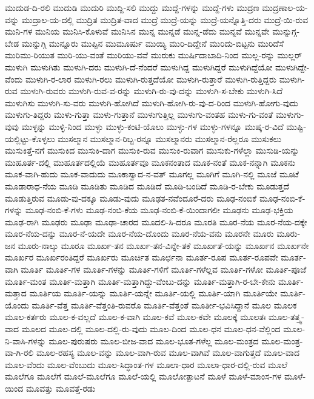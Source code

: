 {ಮುದುಡ-ದಿ-ರಲಿ
ಮುದುಡಿ
ಮುದುರಿ
ಮುದ್ದಿ-ಸಲಿ
ಮುದ್ದು
ಮುದ್ದೆ-ಗಳನ್ನು
ಮುದ್ದೆ-ಗಳು
ಮುದ್ರಣ
ಮುದ್ರಣಾಲ-ಯ-ವನ್ನು
ಮುದ್ರಾಲ-ಯ-ದಲ್ಲಿ
ಮುದ್ರಿತ
ಮುದ್ರಿತ-ವಾದ
ಮುದ್ರೆ
ಮುದ್ರೆ-ಯನ್ನು
ಮುದ್ರೆ-ಯನ್ನೊತ್ತಿ-ದರು
ಮುದ್ರೆ-ಯಿ-ರುವ
ಮುನಿ-ಗಳ
ಮುನಿಯ
ಮುನಿಸಿ-ಕೊಳುವೆ
ಮುನಿಸಿನ
ಮುನ್ನ
ಮುನ್ನಡೆ
ಮುನ್ನ-ಡೆದು
ಮುನ್ನವೆ
ಮುನ್ನವೇ
ಮುನ್ನುಗ್ಗ-ಬೇಡ
ಮುನ್ನುಗ್ಗಿ
ಮುನ್ನೂರು
ಮುಪ್ಪಿನ
ಮುಮೂರ್ಷು
ಮುಯ್ಯಿ
ಮುರಿ-ದಿದ್ದೇನೆ
ಮುರಿದು-ಬಿಟ್ಟನು
ಮುರಿದೆಸೆ
ಮುರಿಮು-ರಿಯುತ
ಮುರಿ-ಯು-ವಂತೆ
ಮುರಿಯು-ವವೆ
ಮುರುಕು
ಮುರ್ಷಿದಾಬಾದಿ-ನಿಂದ
ಮುಲ್ಲ-ರನ್ನು
ಮುಲ್ಲರ್
ಮುಳುಗಿ
ಮುಳುಗಿತು
ಮುಳುಗಿ-ದರು
ಮುಳುಗಿ-ದೆ-ನೆಂದರೆ
ಮುಳುಗಿದ್ದ
ಮುಳುಗಿದ್ದರೆ
ಮುಳುಗಿದ್ದೆಯೋ
ಮುಳುಗಿದ್ದೇ-ವೆಂದು
ಮುಳುಗಿ-ರ-ಲಾರ
ಮುಳುಗಿ-ರಲು
ಮುಳುಗಿ-ರುತ್ತದೆಯೋ
ಮುಳುಗಿ-ರುತ್ತಾರೆ
ಮುಳುಗಿ-ರುತ್ತಿದ್ದರು
ಮುಳುಗಿ-ರುವ
ಮುಳುಗಿ-ರುವರು
ಮುಳುಗಿ-ರುವ-ವ-ರನ್ನು
ಮುಳುಗಿ-ರು-ವು-ದನ್ನು
ಮುಳುಗಿ-ಸ-ಬೇಕು
ಮುಳುಗಿ-ಸಿದೆ
ಮುಳುಗಿಸು
ಮುಳುಗಿ-ಸು-ವರು
ಮುಳುಗಿ-ಹೋಗಿದೆ
ಮುಳುಗಿ-ಹೋಗಿ-ರು-ವು-ದ-ರಿಂದ
ಮುಳುಗಿ-ಹೋಗು-ವುದು
ಮುಳುಗು-ತಿದ್ದರು
ಮುಳು-ಗುತ್ತಾ
ಮುಳು-ಗುತ್ತಾನೆ
ಮುಳುಗುತ್ತಿಲ್ಲ
ಮುಳುಗು-ವಂತಹ
ಮುಳು-ಗು-ವಂತೆ
ಮುಳುಗು-ವುವು
ಮುಳ್ಳನ್ನು
ಮುಳ್ಳಿ-ನಿಂದ
ಮುಳ್ಳು
ಮುಳ್ಳು-ಕಂಟಿ-ಯೊಲು
ಮುಳ್ಳು-ಗಳ
ಮುಳ್ಳು-ಗಳನ್ನೂ
ಮುಷ್ಕ-ರ-ವಿದೆ
ಮುಷ್ಟಿ-ಯಲ್ಲಿಟ್ಟು-ಕೊಳ್ಳಲು
ಮುಸಲ್ಮಾನ
ಮುಸಲ್ಮಾನ-ರಿಬ್ಬ-ರನ್ನೂ
ಮುಸಲ್ಮಾನರು
ಮುಸಲ್ಮಾನ-ರೆಲ್ಲರೂ
ಮುಸುಕಲು
ಮುಸುಕಿತ್ತೆ-ನಗೆ
ಮುಸುಕಿದ
ಮುಸುಕಿ-ದಾಗ
ಮುಸುಕಿ-ರುವ
ಮುಸುಕಿ-ರುವಾಗ
ಮುಸುಕು-ಗಳೆಲ್ಲಾ
ಮುಸುಡಿ-ಯನ್ನು
ಮುಹೂರ್ತ-ದಲ್ಲಿ
ಮುಹೂರ್ತದಲ್ಲಿಯೆ
ಮುಹೂರ್ತವೂ
ಮೂಕನಂತಾದ
ಮೂಕ-ನಂತೆ
ಮೂಕ-ನನ್ನಾಗಿ
ಮೂಕನು
ಮೂಕ-ವಾಗಿ-ಹುದು
ಮೂಕ-ವಾದುದು
ಮೂಕಾಸ್ವಾದ-ನ-ವತ್
ಮೂಗಲ್ಲ
ಮೂಗಿಗೆ
ಮೂಗಿ-ನಲ್ಲಿ
ಮೂಜೆ
ಮೂಟೆ
ಮೂಡಾರಾಧ-ನೆಯ
ಮೂಡಿ
ಮೂಡಿತು
ಮೂಡಿದ
ಮೂಡಿದೆ
ಮೂಡಿ-ಬಂದಿದೆ
ಮೂಡಿ-ರ-ಬೇಕು
ಮೂಡುತ್ತದೆ
ಮೂಡುತ್ತಿರುವ
ಮೂಡು-ವು-ದಕ್ಕೂ
ಮೂಡು-ವುದು
ಮೂಢತ-ನವೆಂದೂರೆ-ದರು
ಮೂಢ-ನಂಬಿಕೆ
ಮೂಢ-ನಂಬಿ-ಕೆ-ಗಳನ್ನು
ಮೂಢ-ನಂಬಿ-ಕೆ-ಗಳು
ಮೂಢ-ನಂಬಿ-ಕೆಯ
ಮೂಢ-ನಂಬಿ-ಕೆ-ಯಿಂದಾಗಲೀ
ಮೂಢನು
ಮೂಢ-ಭಕ್ತಿಯ
ಮೂಢ-ರಾಗಿ
ಮೂಢರು
ಮೂಢಾ
ಮೂಢಾ-ಚಾರದ
ಮೂದಲಿ-ಸಿ-ದರೂ
ಮೂರತಿ
ಮೂರ-ನೆಯ
ಮೂರ-ನೆಯ-ದಕ್ಕೇ
ಮೂರ-ನೆಯ-ದನ್ನು
ಮೂರ-ನೆ-ಯದೇ
ಮೂರ-ನೆಯ-ದೊಂದು
ಮೂರ-ನೆಯ-ವನು
ಮೂರನೇ
ಮೂರು
ಮೂರು-ಜನ
ಮೂರು-ನಾಲ್ಕು
ಮೂರೂ
ಮೂರ್ಖ-ತನ
ಮೂರ್ಖ-ತನ-ವಿನ್ನೇ-ತಕೆ
ಮೂರ್ಖತೆ-ಯನ್ನು
ಮೂರ್ಖನ
ಮೂರ್ಖನೇ
ಮೂರ್ಖರ
ಮೂರ್ಖರಂತಿದ್ದರೆ
ಮೂರ್ಖರು
ಮೂರ್ಚಿತ
ಮೂರ್ಛನಾ
ಮೂರ್ತ-ರೂಪ
ಮೂರ್ತ-ರೂಪವೇ
ಮೂರ್ತ-ವಾಗಿ
ಮೂರ್ತಿ
ಮೂರ್ತಿ-ಗಳ
ಮೂರ್ತಿ-ಗಳನ್ನು
ಮೂರ್ತಿ-ಗಳಿಗೆ
ಮೂರ್ತಿ-ಗಳೆಲ್ಲವ
ಮೂರ್ತಿ-ಗಳೋ
ಮೂರ್ತಿ-ಪೂಜೆ
ಮೂರ್ತಿ-ಮಂತ
ಮೂರ್ತಿ-ಮತ್ತಾಗಿ
ಮೂರ್ತಿ-ಮತ್ತಾಗಿದ್ದು-ವೆಂಬು-ದನ್ನು
ಮೂರ್ತಿ-ಮತ್ತಾಗಿ-ರ-ಬೇ-ಕೇನು
ಮೂರ್ತಿ-ಮತ್ತಾದ
ಮೂರ್ತಿಯ
ಮೂರ್ತಿ-ಯನ್ನು
ಮೂರ್ತಿ-ಯನ್ನೇ
ಮೂರ್ತಿ-ಯಲ್ಲಿ
ಮೂರ್ತಿ-ಯಾಗಿ
ಮೂರ್ತಿಯೇ
ಮೂರ್ತಿ-ಯೊಂದು
ಮೂರ್ತಿ-ವೆತ್ತ
ಮೂರ್ತಿ-ವೆತ್ತಂತಿ-ರುವರೊ
ಮೂರ್ತಿ-ವೆತ್ತಂತೆ
ಮೂರ್ತೀ-ಭವಿಸಿದ್ದಾನೆ
ಮೂಲ
ಮೂಲಕ
ಮೂಲ-ಕರ್ತರು
ಮೂಲ-ಕ-ವಲ್ಲದೆ
ಮೂಲ-ಕ-ವಾಗಿ
ಮೂಲ-ಕವೆ
ಮೂಲ-ಕವೇ
ಮೂಲಕ್ಕೆ
ಮೂಲತಃ
ಮೂಲ-ತತ್ತ್ವ-ವಾದ
ಮೂಲದ
ಮೂಲ-ದಲ್ಲಿ
ಮೂಲ-ದಲ್ಲಿ-ರು-ವುದು
ಮೂಲ-ದಿಂದ
ಮೂಲ-ಧನ
ಮೂಲ-ಧನ-ವೆಲ್ಲಿಂದ
ಮೂಲ-ನಿ-ವಾಸಿ-ಗಳನ್ನು
ಮೂಲ-ಪುರುಷರು
ಮೂಲ-ಬೀಜ-ವಾದ
ಮೂಲ-ಭೂತ-ಗಳೆಲ್ಲ
ಮೂಲ-ಮಂತ್ರದ
ಮೂಲ-ಮಂತ್ರ-ವಾ-ಗಿ-ರಲಿ
ಮೂಲ-ರಹಸ್ಯ
ಮೂಲ-ವನ್ನು
ಮೂಲ-ವಾಗಿ-ರುವ
ಮೂಲ-ವಾಗಿವೆ
ಮೂಲ-ವಾಗುತ್ತದೆ
ಮೂಲ-ವಾದ
ಮೂಲ-ವೆಂದು
ಮೂಲ-ವೆಂಬುದು
ಮೂಲ-ಸಿದ್ಧಾಂತ-ಗಳ
ಮೂಲಾ-ಧಾರ
ಮೂಲಾ-ಧಾರ-ದಲ್ಲಿ-ರುವ
ಮೂಲೆ
ಮೂಲೆಗೂ
ಮೂಲೆಗೆ
ಮೂಲೆ-ಮೂಲೆಗೂ
ಮೂಲೆ-ಯಲ್ಲಿ
ಮೂಲೋತ್ಪಾಟನೆ
ಮೂಳೆ
ಮೂಳೆ-ಮಾಂಸ-ಗಳ
ಮೂಳೆ-ಯಿಂದ
ಮೂವತ್ತು
ಮೂವತ್ತೆ-ರಡು
}
